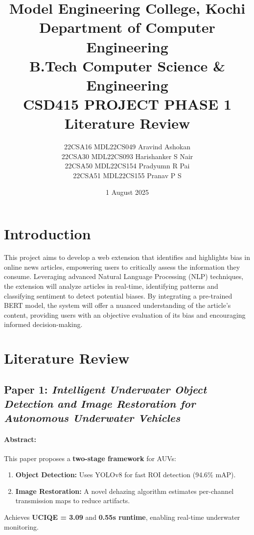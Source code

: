 \documentclass{article}
\begin{document}
\title{Model Engineering College, Kochi\\
Department of Computer Engineering\\
B.Tech Computer Science & Engineering\\
CSD415 PROJECT PHASE 1\\
\textbf{Literature Review}\\
}

\author{
22CSA16 MDL22CS049 Aravind Ashokan\\
22CSA30 MDL22CS093 Harishanker S Nair\\
22CSA50 MDL22CS154 Pradyumn R Pai\\
22CSA51 MDL22CS155 Pranav P S\\
}
\date{1 August 2025}
\maketitle

\section{Introduction}
This project aims to develop a web extension that identifies and highlights bias in online news articles, empowering users to critically assess the information they consume. Leveraging advanced Natural Language Processing (NLP) techniques, the extension will analyze articles in real-time, identifying patterns and classifying sentiment to detect potential biases. By integrating a pre-trained BERT model, the system will offer a nuanced understanding of the article's content, providing users with an objective evaluation of its bias and encouraging informed decision-making.

\section{Literature Review}

\subsection{Paper 1: \textit{Intelligent Underwater Object Detection and Image Restoration for Autonomous Underwater Vehicles}}

\paragraph{Abstract:}  
This paper proposes a \textbf{two-stage framework} for AUVs:  
\begin{enumerate}
    \item \textbf{Object Detection:} Uses YOLOv8 for fast ROI detection (94.6\% mAP).
    \item \textbf{Image Restoration:} A novel dehazing algorithm estimates per-channel transmission maps to reduce artifacts.
\end{enumerate}
Achieves \textbf{UCIQE = 3.09} and \textbf{0.55s runtime}, enabling real-time underwater monitoring.
\end{document}
